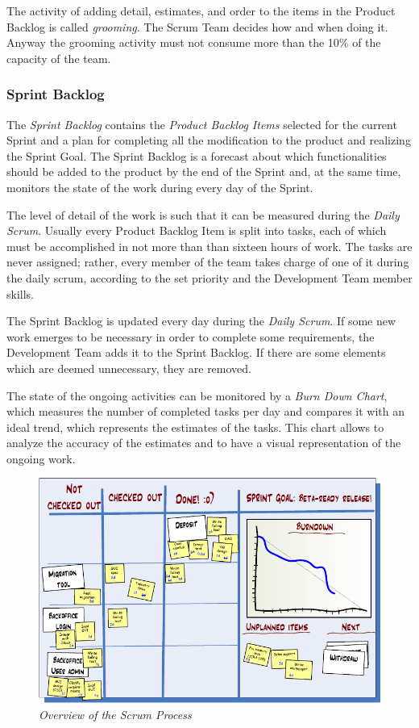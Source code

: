 			The activity of adding detail, estimates, and order to the items in the Product Backlog is called \emph{grooming}. The Scrum Team decides how and when doing it. Anyway the grooming activity must not consume more than the 10\% of the capacity of the team.
		

			\subsubsection{Sprint Backlog}
			The \emph{Sprint Backlog} contains the \emph{Product Backlog Items} selected for the current Sprint and a plan for completing all the modification to the product and realizing the Sprint Goal. 
			The Sprint Backlog is a forecast about which functionalities should be added to the product by the end of the Sprint and, at the same time, monitors the state of the work during every day of the Sprint.

			The level of detail of the work is such that it can be measured during the \emph{Daily Scrum}. Usually every Product Backlog Item is split into tasks, each of which must be accomplished in not more than than sixteen hours of work. The tasks are never assigned; rather, every member of the team takes charge of one of it during the daily scrum, according to the set priority and the Development Team member skills.
	
			The Sprint Backlog is updated every day during the \emph{Daily Scrum}. If some new work emerges to be necessary in order to complete some requirements, the Development Team adds it to the Sprint Backlog. If there are some elements which are deemed unnecessary, they are removed.

			The state of the ongoing activities can be monitored by a \emph{Burn Down Chart}, which measures the number of completed tasks per day and compares it with an ideal trend, which represents the estimates of the tasks. This chart allows to analyze the accuracy of the estimates and to have a visual representation of the ongoing work.

			\begin{figure}[h]
			  \begin{center} 
			    \includegraphics[scale=0.45]{images/ch_04/task_board_and_chart.png}
			  \end{center} 
			  \caption{\textit{Overview of the Scrum Process}}  
			  \label{fig:ScrumProcess}
		  	\end{figure}

